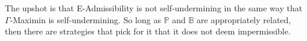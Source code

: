 \documentclass[a4paper]{article}
\newtheorem{proposition}[theorem]{Proposition}
\renewcommand\P{\mathbb{P}} %
\newcommand\EU{\mathrm{EU}}
\newcommand\EAd{\mathrm{EAd}}
\newcommand{\D}{\mathcal{D}}
\newcommand{\Decs}{\mathcal{D}}
\renewcommand\S{\mathcal{S}}
\newcommand\s{\mathsf{s}}
\newcommand{\IB}{\mathbb{B}}
\newcommand{\IP}{\P}
\newcommand{\todoold}[2][]{\todo[backgroundcolor=white,bordercolor=orange!10,linecolor=gray!10, #1,caption={},textcolor=gray]{Pre-rev: #2}}
\newcommand{\todooldinfo}[2][]{\todoold[#1]{#2}}
\renewcommand{\color}[1]{}
\newcommand{\Strategies}{\S}
\newcommand\SetDelimiter[1][]{
	\nonscript\,#1\vert \allowbreak \nonscript\,\mathopen{}}
\providecommand\given{\SetDelimiter}
\newcommand*\diff{\mathop{}\!\mathrm{d}}
\renewcommand{\geq}{\geqslant}
\newenvironment{CCM rewritten}
{\begingroup\color{blue}} %
{\endgroup}              %
\begin{document}
 
 
%	
The upshot is that E-Admissibility is not self-undermining in the same way that $\Gamma$-Maximin is self-undermining. So long as $\IP$ and $\IB$ are appropriately related, then there are strategies that pick for it that it does not deem impermissible.
\end{document}
